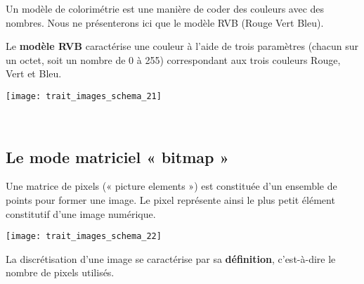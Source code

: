 Un modèle de colorimétrie est une manière de coder des couleurs
avec des nombres. Nous ne présenterons ici que le modèle RVB
(Rouge Vert Bleu).

Le \textbf{modèle RVB} caractérise une couleur à l'aide de trois paramètres
(chacun sur un octet, soit un nombre de 0 à 255) correspondant
aux trois couleurs Rouge, Vert et Bleu.

\begin{minipage}{3cm}
 \begin{center}
{\texttt{[image: trait\_images\_schema\_21]}}
\end{center}
\end{minipage}
\begin{minipage}{14cm}
 \noindent{}
\end{minipage}


~~\\

\subsection{Le mode matriciel « bitmap »}

Une matrice de pixels (« picture elements ») est constituée d'un ensemble de points pour former une image. Le pixel représente ainsi le plus petit élément constitutif 
d'une image numérique.



\begin{minipage}{4cm}
 {\texttt{[image: trait\_images\_schema\_22]}}
\end{minipage}
\begin{minipage}{12cm}
La discrétisation d'une image se caractérise par sa \textbf{définition}, c'est-à-dire le nombre de pixels utilisés.
\end{minipage}

~~\\

